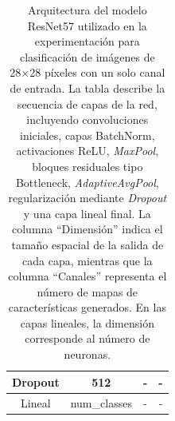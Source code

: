 \begin{table}[]
\begin{tabular}{|c|c|c|c|}
Dropout                        & 512                                        & -                                       & -                                        \\ \hline
Lineal                         & num\_classes                               & -                                       & -                                        \\ \hline
\end{tabular}
\caption[Arquitectura del modelo ResNet57 utilizado en la experimentación para clasificación de imágenes de 28×28 píxeles con un solo canal de entrada]{Arquitectura del modelo ResNet57 utilizado en la experimentación para clasificación de imágenes de 28×28 píxeles con un solo canal de entrada. La tabla describe la secuencia de capas de la red, incluyendo convoluciones iniciales, capas BatchNorm, activaciones ReLU, \textit{MaxPool}, bloques residuales tipo Bottleneck, \textit{AdaptiveAvgPool}, regularización mediante \textit{Dropout} y una capa lineal final. La columna ``Dimensión'' indica el tamaño espacial de la salida de cada capa, mientras que la columna ``Canales'' representa el número de mapas de características generados. En las capas lineales, la dimensión corresponde al número de neuronas.}
\label{table:resnet57}
\end{table}


